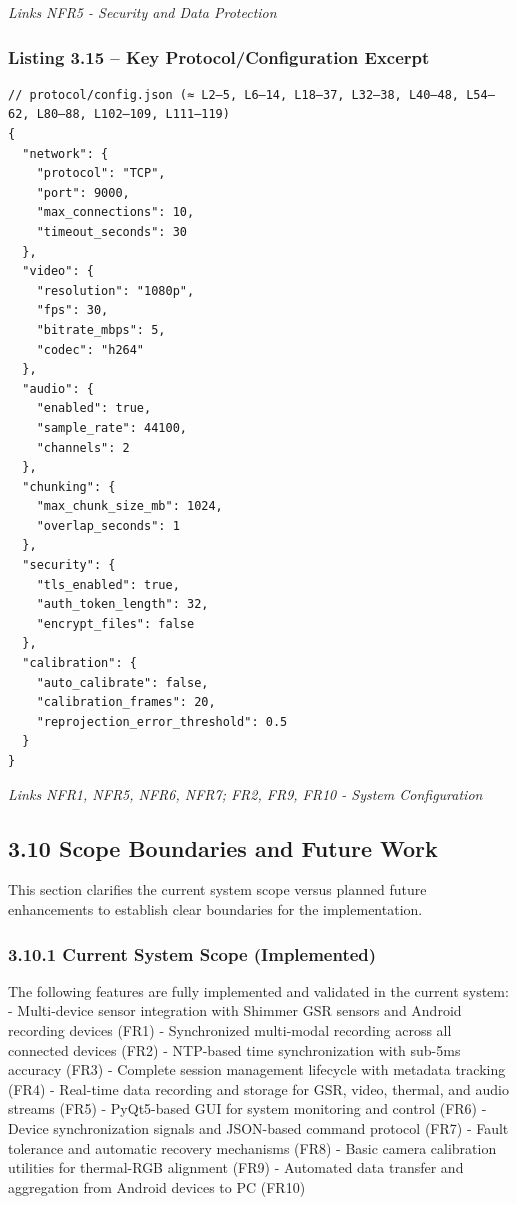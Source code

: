 \documentclass[12pt,a4paper]{article}
\begin{document}
\emph{Links NFR5 - Security and Data Protection}

\subsubsection{Listing 3.15 -- Key Protocol/Configuration Excerpt}\label{listing-3.15-key-protocolconfiguration-excerpt}

\begin{lstlisting}
// protocol/config.json (≈ L2–5, L6–14, L18–37, L32–38, L40–48, L54–62, L80–88, L102–109, L111–119)
{
  "network": {
    "protocol": "TCP",
    "port": 9000,
    "max_connections": 10,
    "timeout_seconds": 30
  },
  "video": {
    "resolution": "1080p",
    "fps": 30,
    "bitrate_mbps": 5,
    "codec": "h264"
  },
  "audio": {
    "enabled": true,
    "sample_rate": 44100,
    "channels": 2
  },
  "chunking": {
    "max_chunk_size_mb": 1024,
    "overlap_seconds": 1
  },
  "security": {
    "tls_enabled": true,
    "auth_token_length": 32,
    "encrypt_files": false
  },
  "calibration": {
    "auto_calibrate": false,
    "calibration_frames": 20,
    "reprojection_error_threshold": 0.5
  }
}
\end{lstlisting}

\emph{Links NFR1, NFR5, NFR6, NFR7; FR2, FR9, FR10 - System Configuration}

\subsection{3.10 Scope Boundaries and Future Work}\label{scope-boundaries-and-future-work}

This section clarifies the current system scope versus planned future enhancements to establish clear boundaries for the implementation.

\subsubsection{3.10.1 Current System Scope (Implemented)}\label{current-system-scope-implemented}

The following features are fully implemented and validated in the current system: - Multi-device sensor integration with Shimmer GSR sensors and Android recording devices (FR1) - Synchronized multi-modal recording across all connected devices (FR2) - NTP-based time synchronization with sub-5ms accuracy (FR3) - Complete session management lifecycle with metadata tracking (FR4) - Real-time data recording and storage for GSR, video, thermal, and audio streams (FR5) - PyQt5-based GUI for system monitoring and control (FR6) - Device synchronization signals and JSON-based command protocol (FR7) - Fault tolerance and automatic recovery mechanisms (FR8) - Basic camera calibration utilities for thermal-RGB alignment (FR9) - Automated data transfer and aggregation from Android devices to PC (FR10)
\end{document}
